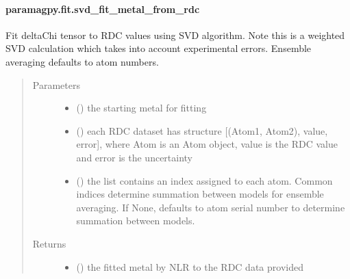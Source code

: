 \documentclass[a4paper,10pt,english]{sphinxmanual}
\begin{document}
\paragraph{paramagpy.fit.svd\_fit\_metal\_from\_rdc}
\label{\detokenize{reference/generated/paramagpy.fit.svd_fit_metal_from_rdc:paramagpy-fit-svd-fit-metal-from-rdc}}\label{\detokenize{reference/generated/paramagpy.fit.svd_fit_metal_from_rdc::doc}}

\begin{fulllineitems}
\label{\detokenize{reference/generated/paramagpy.fit.svd_fit_metal_from_rdc:paramagpy.fit.svd_fit_metal_from_rdc}}
Fit deltaChi tensor to RDC values using SVD algorithm.
Note this is a weighted SVD calculation which takes into account
experimental errors.
Ensemble averaging defaults to atom numbers.
\begin{quote}\begin{description}
\item[{Parameters}] \leavevmode\begin{itemize}
\item {} 
 () \textendash{} the starting metal for fitting

\item {} 
 () \textendash{} each RDC dataset has structure {[}(Atom1, Atom2), value, error{]},
where Atom is an Atom object, value is the RDC value
and error is the uncertainty

\item {} 
 (\sphinxstyleliteralemphasis{\sphinxupquote{, }}) \textendash{} the list contains an index assigned to each atom.
Common indices determine summation between models
for ensemble averaging.
If None, defaults to atom serial number to determine summation
between models.

\end{itemize}

\item[{Returns}] \leavevmode
\begin{itemize}
\item {} 
 () \textendash{} the fitted metal by NLR to the RDC data provided


\end{itemize}
\end{description}
\end{quote}
\end{fulllineitems}
\end{document}
